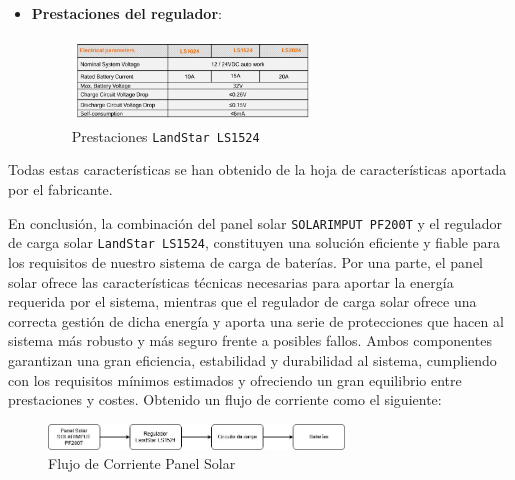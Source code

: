 \begin{itemize}
    \item \textbf{Prestaciones del regulador}:
    \begin{figure}[H]
        \centering
        \includegraphics[width=0.6\textwidth]{images/2-hardware/Panel Solar/Regulador.png}
        \caption{Prestaciones \texttt{LandStar LS1524}}
        \label{fig:4-1-2-Regulador}
    \end{figure}
\end{itemize}

Todas estas características se han obtenido de la hoja de características aportada por el fabricante. \cite{epsolarLandStarSeriesSolar}

En conclusión, la combinación del panel solar \texttt{SOLARIMPUT PF200T} y el regulador de carga solar \texttt{LandStar LS1524}, constituyen una solución eficiente y fiable para los requisitos de nuestro sistema de carga de baterías. Por una parte, el panel solar ofrece las características técnicas necesarias para aportar la energía requerida por el sistema, mientras que el regulador de carga solar ofrece una correcta gestión de dicha energía y aporta una serie de protecciones que hacen al sistema más robusto y más seguro frente a posibles fallos. Ambos componentes garantizan una gran eficiencia, estabilidad y durabilidad al sistema, cumpliendo con los requisitos mínimos estimados y ofreciendo un gran equilibrio entre prestaciones y costes. Obtenido un flujo de corriente como el siguiente:

\begin{figure}[H]
    \centering
    \includegraphics[width=0.7\textwidth]{images/2-hardware/Panel Solar/DiagramaBloquesPanel.jpg}
    \caption{Flujo de Corriente Panel Solar}
    \label{fig:4-1-2-FlujoCorrientePanel}
\end{figure}


